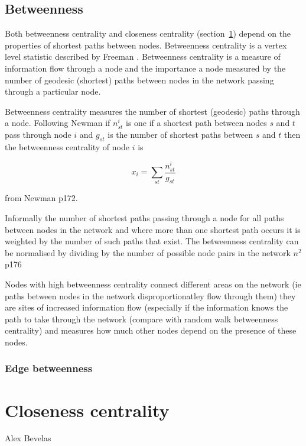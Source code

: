 \subsection{Betweenness}
\label{sec:Betweeness centrality}
Both betweenness centrality and closeness centrality (section~\ref{sec:closenesscentrality}) depend on the properties of shortest paths between nodes. Betweenness centrality is a vertex level statistic described by Freeman \cite{freeman1977set}. Betweenness centrality is a measure of information flow through a node and the importance a node measured by the number of geodesic (shortest) paths between nodes in the network passing through a particular node. 

Betweenness centrality measures the number of shortest (geodesic) paths through a node. Following Newman if $n_{st}^i$ is one if a shortest path between nodes $s$ and $t$ pass through node $i$ and $g_{st}$ is the number of shortest paths between $s$ and $t$ then the betweenness centrality of node $i$ is

\begin{equation}
    x_i = \sum_{st} \frac{n_{st}^i}{g_{st}}
\end{equation}
\label{eq: Betweenness centrality}

from Newman \cite{newman2018networks} p172. 

Informally the number of shortest paths passing through a node for all paths between nodes in the network and where more than one shortest path occurs it is weighted by the number of such paths that exist. The betweenness centrality can be normalised by dividing by the number of possible node pairs in the network $n^2$ \cite{newman2018networks} p176

Nodes with high betweenness centrality connect different areas on the network (ie paths between nodes in the network disproportionatley flow through them) they are sites of increased information flow (especially if the information knows the path to take through the network (compare with random walk betweenness centrality) and measures how much other nodes depend on the presence of these nodes.



 
\subsubsection{Edge betweenness}


\section{Closeness centrality}
\label{sec:closenesscentrality}
Alex Bevelas

